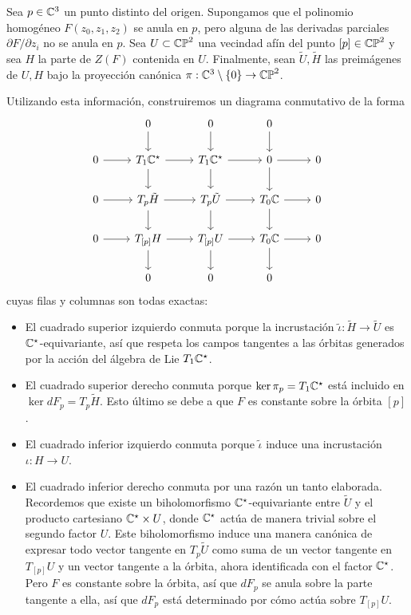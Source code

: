 \begin{solution}
Sea $p \in \mathbb C^3$ un punto distinto del origen. Supongamos que el polinomio homogéneo $F(z_0, z_1, z_2)$ se anula en $p$, pero alguna de las derivadas parciales $\partial F / \partial z_i$ no se anula en $p$. Sea $U \subset \mathbb {CP}^2$ una vecindad afín del punto $[p] \in \mathbb {CP}^2$ y sea $H$ la parte de $Z(F)$ contenida en $U$. Finalmente, sean $\tilde U, \tilde H$ las preimágenes de $U, H$ bajo la proyección canónica $\pi : \mathbb C^3 \setminus \{ 0 \} \to \mathbb {CP}^2$.

Utilizando esta información, construiremos un diagrama conmutativo de la forma
$$
\begin{tikzcd}
         & 0               \d & 0               \d & 0         \d \\
    0 \r & T_1 \C^\star \r \d & T_1 \C^\star \r \d & 0      \r \d & 0 \\
    0 \r & T_p \tilde H \r \d & T_p \tilde U \r \d & T_0 \C \r \d & 0 \\
    0 \r & T_{[p]}    H \r \d & T_{[p]}    U \r \d & T_0 \C \r \d & 0 \\
         & 0                  & 0                  & 0
\end{tikzcd}
$$
cuyas filas y columnas son todas exactas:
\begin{itemize}
    \item El cuadrado superior izquierdo conmuta porque la incrustación $\tilde \iota : \tilde H \to \tilde U$ es $\mathbb C^\star$-equivariante, así que respeta los campos tangentes a las órbitas generados por la acción del álgebra de Lie $T_1 \mathbb C^\star$.
    
    \item El cuadrado superior derecho conmuta porque $\ker \pi_p = T_1 \mathbb C^\star$ está incluido en $\ker dF_p = T_p \tilde H$. Esto último se debe a que $F$ es constante sobre la órbita $[p]$.
    
    \item El cuadrado inferior izquierdo conmuta porque $\tilde \iota$ induce una incrustación $\iota : H \to U$.
    
    \item El cuadrado inferior derecho conmuta por una razón un tanto elaborada. Recordemos que existe un biholomorfismo $\mathbb C^\star$-equivariante entre $\tilde U$ y el producto cartesiano $\mathbb C^\star \times U$, donde $\mathbb C^\star$ actúa de manera trivial sobre el segundo factor $U$. Este biholomorfismo induce una manera canónica de expresar todo vector tangente en $T_p \tilde U$ como suma de un vector tangente en $T_{[p]} U$ y un vector tangente a la órbita, ahora identificada con el factor $\mathbb C^\star$. Pero $F$ es constante sobre la órbita, así que $dF_p$ se anula sobre la parte tangente a ella, así que $dF_p$ está determinado por cómo actúa sobre $T_{[p]} U$.
    

\end{itemize}
\end{solution}
